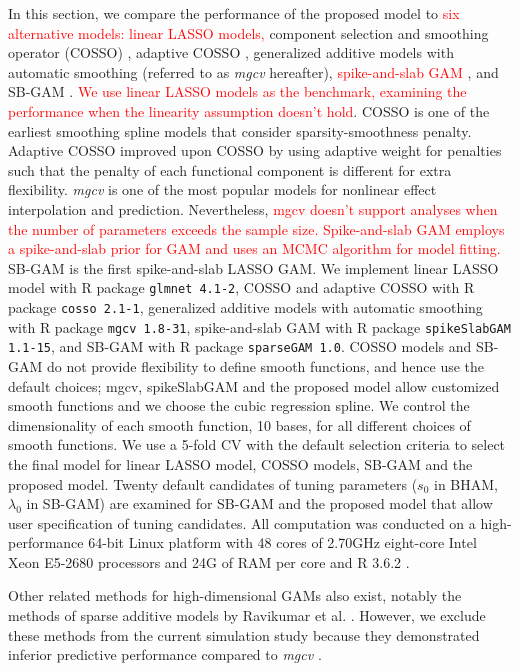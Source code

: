 \documentclass[AMA,STIX1COL,]{WileyNJD-v2}
\begin{document}
In this section, we compare the performance of the proposed model to
\textcolor{red}{six alternative models: linear LASSO models,} component
selection and smoothing operator (COSSO) \citep{Zhang2006GAM}, adaptive
COSSO \citep{Storlie2011}, generalized additive models with automatic
smoothing (referred to as \textit{mgcv} hereafter)\citep{Wood2011},
\textcolor{red}{spike-and-slab GAM \cite{Scheipl2012}}, and SB-GAM
\citep{Bai2021}.
\textcolor{red}{We use linear LASSO models as the benchmark, examining the performance when the linearity assumption doesn't hold}.
COSSO is one of the earliest smoothing spline models that consider
sparsity-smoothness penalty. Adaptive COSSO improved upon COSSO by using
adaptive weight for penalties such that the penalty of each functional
component is different for extra flexibility. \textit{mgcv} is one of
the most popular models for nonlinear effect interpolation and
prediction. Nevertheless,
\textcolor{red}{mgcv doesn't support analyses when the number of parameters exceeds the sample size.}
\textcolor{red}{Spike-and-slab GAM employs a spike-and-slab prior for GAM and uses an MCMC algorithm for model fitting.}
SB-GAM is the first spike-and-slab LASSO GAM. We implement linear LASSO
model with R package \texttt{glmnet 4.1-2}, COSSO and adaptive COSSO
with R package \texttt{cosso 2.1-1}, generalized additive models with
automatic smoothing with R package \texttt{mgcv 1.8-31}, spike-and-slab
GAM with R package \texttt{spikeSlabGAM 1.1-15}, and SB-GAM with R
package \texttt{sparseGAM 1.0}. COSSO models and SB-GAM do not provide
flexibility to define smooth functions, and hence use the default
choices; mgcv, spikeSlabGAM and the proposed model allow customized
smooth functions and we choose the cubic regression spline. We control
the dimensionality of each smooth function, 10 bases, for all different
choices of smooth functions. We use a 5-fold CV with the default
selection criteria to select the final model for linear LASSO model,
COSSO models, SB-GAM and the proposed model. Twenty default candidates
of tuning parameters (\(s_0\) in BHAM, \(\lambda_0\) in SB-GAM) are
examined for SB-GAM and the proposed model that allow user specification
of tuning candidates. All computation was conducted on a
high-performance 64-bit Linux platform with 48 cores of 2.70GHz
eight-core Intel Xeon E5-2680 processors and 24G of RAM per core and R
3.6.2 \citep{R}.

Other related methods for high-dimensional GAMs also exist, notably the
methods of sparse additive models by Ravikumar et al.
\citep{Ravikumar2009}. However, we exclude these methods from the
current simulation study because they demonstrated inferior predictive
performance compared to \textit{mgcv} \citep{Scheipl2013}.
\end{document}
